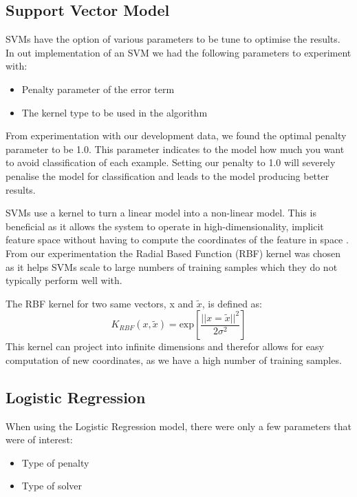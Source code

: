 \documentclass[bsc,frontabs,twoside,singlespacing,parskip,deptreport]{infthesis}     %
\begin{document}
 \subsection{Support Vector Model}
 SVMs have the option of various parameters to be tune to optimise the results.
 In out implementation of an SVM we had the following parameters to experiment with:
 \begin{itemize}
 \item Penalty parameter of the error term
 \item The kernel type to be used in the algorithm
 \end{itemize}

 From experimentation with our development data, we found the optimal penalty parameter to be 1.0.
 This parameter indicates to the model how much you want to avoid classification of each example.
 Setting our penalty to 1.0 will severely penalise the model for classification and leads to the model producing
 better results.

 SVMs use a kernel to turn a linear model into a non-linear model. This is beneficial as it allows the system
 to operate in high-dimensionality, implicit feature space without having to compute the coordinates of the feature
 in space \cite{hofmann2008kernel}.
 From our experimentation the Radial Based Function (RBF) kernel was chosen as it helps SVMs scale to large numbers of
 training samples which they do not typically perform well with.

 The RBF kernel for two same vectors, x and $\tilde{x}$, is defined as:
 \begin{equation}
   K_{RBF} (x, \tilde{x}) = \text{exp}[ \frac{||x =\tilde{x}||^2}{2\sigma^2}]\nonumber
 \end{equation}
\cite{hofmann2008kernel}
 This kernel can project into infinite dimensions and therefor allows for easy computation of new coordinates, as
 we have a high number of training samples.
 
 \subsection{Logistic Regression}\label{sec:log-reg}
 When using the Logistic Regression model, there were only a few parameters that were of interest:
 \begin{itemize}
   \item Type of penalty
   \item Type of solver
 \end{itemize}
\end{document}
